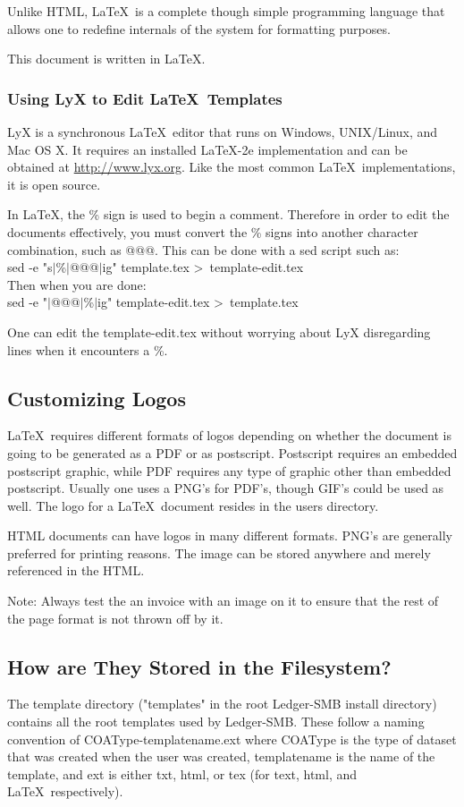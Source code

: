 \documentclass{article}
\begin{document}
Unlike HTML, \LaTeX\ is a complete though simple programming language that allows
one to redefine internals of the system for formatting purposes.

This document is written in \LaTeX. 

\subsubsection{Using LyX to Edit \LaTeX\ Templates}
LyX is a synchronous \LaTeX\ editor that runs on Windows, UNIX/Linux, and
Mac OS X.  It requires an installed \LaTeX-2e implementation and can be obtained
at \url{http://www.lyx.org}.  Like the most common \LaTeX\ implementations, it is
open source.

In \LaTeX, the \% sign is used to begin a comment.  Therefore in order to edit
the documents effectively, you must convert the \% signs into another character
combination, such as @@@.  This can be done with a sed script such as:\\
sed -e "s$\vert$\%$\vert$@@@$\vert$ig" template.tex \textgreater\ 
template-edit.tex \\
Then when you are done:\\
sed -e "$\vert$@@@$\vert$\%$\vert$ig" template-edit.tex \textgreater\ 
template.tex

One can edit the template-edit.tex without worrying about LyX disregarding lines
when it encounters a \%.

\subsection{Customizing Logos}
\LaTeX\ requires different formats of logos depending on whether the document is
going to be generated as a PDF or as postscript.  Postscript requires an
embedded postscript graphic, while PDF requires any type of graphic other than
embedded postscript.  Usually one uses a PNG's for PDF's, though GIF's could be
used as well. The logo for a \LaTeX\ document resides in the users directory.

HTML documents can have logos in many different formats.  PNG's are generally
preferred for printing reasons.  The image can be stored anywhere and merely
referenced in the HTML.

Note:  Always test the an invoice with an image on it to ensure that the rest of
the page format is not thrown off by it.

\subsection{How are They Stored in the Filesystem?}
The template directory ("templates" in the root Ledger-SMB install directory)
contains all the root templates used by Ledger-SMB.  These follow a naming
convention of COAType-templatename.ext where COAType is the type of dataset that
was created when the user was created, templatename is the name of the template,
and ext is either txt, html, or tex (for text, html, and \LaTeX\ respectively).
\end{document}
